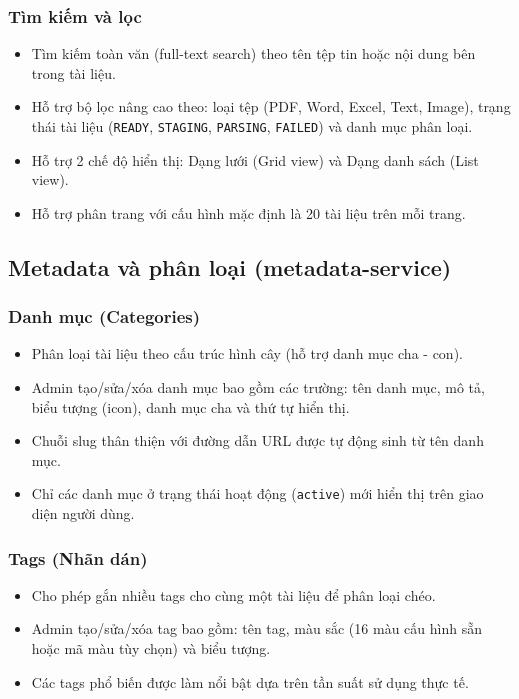 \documentclass[12pt,a4paper]{report}
\begin{document}
\subsubsection{Tìm kiếm và lọc}
\begin{itemize}
    \item Tìm kiếm toàn văn (full-text search) theo tên tệp tin hoặc nội dung bên trong tài liệu.
    \item Hỗ trợ bộ lọc nâng cao theo: loại tệp (PDF, Word, Excel, Text, Image), trạng thái tài liệu (\texttt{READY}, \texttt{STAGING}, \texttt{PARSING}, \texttt{FAILED}) và danh mục phân loại.
    \item Hỗ trợ 2 chế độ hiển thị: Dạng lưới (Grid view) và Dạng danh sách (List view).
    \item Hỗ trợ phân trang với cấu hình mặc định là 20 tài liệu trên mỗi trang.
\end{itemize}

\subsection{Metadata và phân loại (metadata-service)}

\subsubsection{Danh mục (Categories)}
\begin{itemize}
    \item Phân loại tài liệu theo cấu trúc hình cây (hỗ trợ danh mục cha - con).
    \item Admin tạo/sửa/xóa danh mục bao gồm các trường: tên danh mục, mô tả, biểu tượng (icon), danh mục cha và thứ tự hiển thị.
    \item Chuỗi slug thân thiện với đường dẫn URL được tự động sinh từ tên danh mục.
    \item Chỉ các danh mục ở trạng thái hoạt động (\texttt{active}) mới hiển thị trên giao diện người dùng.
\end{itemize}

\subsubsection{Tags (Nhãn dán)}
\begin{itemize}
    \item Cho phép gắn nhiều tags cho cùng một tài liệu để phân loại chéo.
    \item Admin tạo/sửa/xóa tag bao gồm: tên tag, màu sắc (16 màu cấu hình sẵn hoặc mã màu tùy chọn) và biểu tượng.
    \item Các tags phổ biến được làm nổi bật dựa trên tần suất sử dụng thực tế.
\end{itemize}
\end{document}
